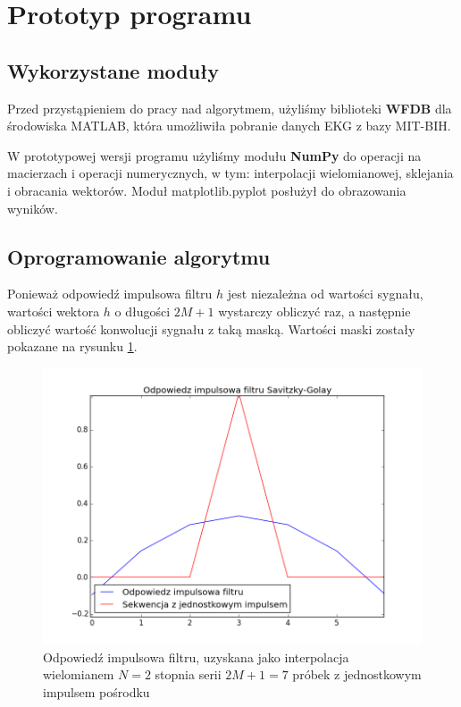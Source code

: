 \section{Prototyp programu}
\subsection{Wykorzystane moduły}
Przed przystąpieniem do pracy nad algorytmem, użyliśmy biblioteki \textbf{WFDB} dla środowiska MATLAB, która umożliwiła pobranie danych EKG z bazy MIT-BIH\cite{mit-bih}.

W prototypowej wersji programu użyliśmy modułu \textbf{NumPy} do operacji na macierzach i operacji numerycznych, w tym: interpolacji wielomianowej, sklejania i obracania wektorów. 
Moduł matplotlib.pyplot posłużył do obrazowania wyników.

\subsection{Oprogramowanie algorytmu}
Ponieważ odpowiedź impulsowa filtru $h$ jest niezależna od wartości sygnału, wartości wektora $h$ o długości $2M+1$ wystarczy obliczyć raz, a następnie obliczyć wartość konwolucji sygnału z taką maską. Wartości maski zostały pokazane na rysunku \ref{rys:impuls}.

\begin{figure}[!htb]
  \begin{center}
    \includegraphics[scale=0.8]
    {img/impulse.png}
  \end{center}
  \caption{Odpowiedź impulsowa filtru, uzyskana jako interpolacja wielomianem $N=2$ stopnia serii $2M+1=7$ próbek z jednostkowym impulsem pośrodku}
  \label{rys:impuls}
\end{figure}

